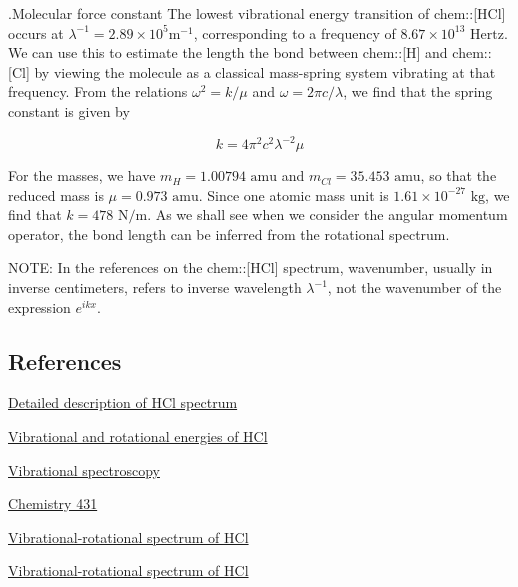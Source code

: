 
.Molecular force constant
The lowest vibrational energy transition of chem::[HCl] occurs at $\lambda^{-1} = 2.89 \times 10^{5} \text{m}^{-1}$, corresponding to a frequency of $8.67\times 10^{13} \text{ Hertz}$. We can use this to estimate the length the bond between chem::[H] and chem::[Cl] by viewing the molecule as a classical mass-spring system vibrating at that frequency.  From the relations $\omega^2 = k/\mu$ and $\omega = 2\pi c/\lambda$, we find that the spring constant is given by

\begin{equation}
k = 4\pi^2 c^2 \lambda^{-2}\mu
\end{equation}

For the masses, we have $m_H = 1.00794\text{ amu}$ and  $m_{Cl} = 35.453\text{ amu}$, so that the reduced mass is $\mu = 0.973\text{ amu}$.  Since one atomic mass unit is $1.61\times 10^{-27}\text{ kg}$, we find that $k = 478\text{ N/m}$.  As we shall see when we consider the angular momentum operator, the bond length can be inferred from the rotational spectrum.

NOTE: In the references on the chem::[HCl] spectrum, wavenumber, usually in inverse centimeters, refers to inverse wavelength $\lambda^{-1}$, not the wavenumber of the expression $e^{ikx}$.


\subsection{References}


\href{http://infohost.nmt.edu/~jaltig/HCl.pdf}{Detailed description of HCl spectrum}

\href{http://hyperphysics.phy-astr.gsu.edu/hbase/molecule/vibrot.html}{Vibrational and rotational energies of HCl}


\href{http://ocw.mit.edu/courses/chemistry/5-61-physical-chemistry-fall-2007/lecture-notes/lecture35.pdf}{Vibrational spectroscopy}



\href{http://www4.ncsu.edu/~franzen/public_html/CH431/lecture/lec_5.pdf}{Chemistry 431}

\href{http://www2.chem.uic.edu/chem343/Manuals/MainLabs/FTIR_F12.pdf}{Vibrational-rotational spectrum of HCl}

\href{http://www.phys.ufl.edu/courses/phy4803L/group_III/infra_red/irspec.pdf}{Vibrational-rotational spectrum of HCl}

